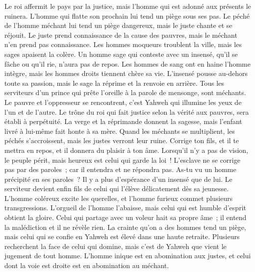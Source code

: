 \begin{multicols}{2}
Le roi affermit le pays par la justice, mais l'homme qui est adonné aux présents le ruinera.
L'homme qui flatte son prochain lui tend un piège sous ses pas.
Le péché de l'homme méchant lui tend un piège dangereux, mais le juste chante et se réjouit.
Le juste prend connaissance de la cause des pauvres, mais le méchant n'en prend pas connaissance.
Les hommes moqueurs troublent la ville, mais les sages apaisent la colère.
Un homme sage qui conteste avec un insensé, qu'il se fâche ou qu'il rie, n'aura pas de repos.
Les hommes de sang ont en haine l'homme intègre, mais les hommes droits tiennent chère sa vie.
L'insensé pousse au-dehors toute sa passion, mais le sage la réprime et la renvoie en arrière.
Tous les serviteurs d'un prince qui prête l'oreille à la parole de mensonge, sont méchants.
Le pauvre et l'oppresseur se rencontrent, c'est Yahweh qui illumine les yeux de l'un et de l'autre.
Le trône du roi qui fait justice selon la vérité aux pauvres, sera établi à perpétuité.
La verge et la réprimande donnent la sagesse, mais l'enfant livré à lui-même fait honte à sa mère.
Quand les méchants se multiplient, les péchés s'accroissent, mais les justes verront leur ruine.
Corrige ton fils, et il te mettra en repos, et il donnera du plaisir à ton âme.
Lorsqu'il n'y a pas de vision, le peuple périt, mais heureux est celui qui garde la loi~!
L'esclave ne se corrige pas par des paroles~; car il entendra et ne répondra pas.
As-tu vu un homme précipité en ses paroles~? Il y a plus d'espérance d'un insensé que de lui.
Le serviteur devient enfin fils de celui qui l'élève délicatement dès sa jeunesse.
L'homme coléreux excite les querelles, et l'homme furieux commet plusieurs transgressions.
L'orgueil de l'homme l'abaisse, mais celui qui est humble d'esprit obtient la gloire.
Celui qui partage avec un voleur hait sa propre âme~; il entend la malédiction et il ne révèle rien.
La crainte qu'on a des hommes tend un piège, mais celui qui se confie en Yahweh est élevé dans une haute retraite.
Plusieurs recherchent la face de celui qui domine, mais c'est de Yahweh que vient le jugement de tout homme.
L'homme inique est en abomination aux justes, et celui dont la voie est droite est en abomination au méchant.

\end{multicols}

